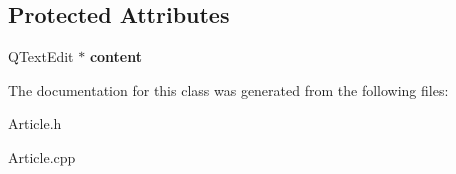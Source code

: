 \subsection*{\-Protected \-Attributes}
\begin{DoxyCompactItemize}
\item 
\hypertarget{classArticleEditor_afe9ce3d19084c00eda6c783073dd4fa0}{\-Q\-Text\-Edit $\ast$ {\bfseries content}}\label{classArticleEditor_afe9ce3d19084c00eda6c783073dd4fa0}

\end{DoxyCompactItemize}


\-The documentation for this class was generated from the following files\-:\begin{DoxyCompactItemize}
\item 
\-Article.\-h\item 
\-Article.\-cpp\end{DoxyCompactItemize}

